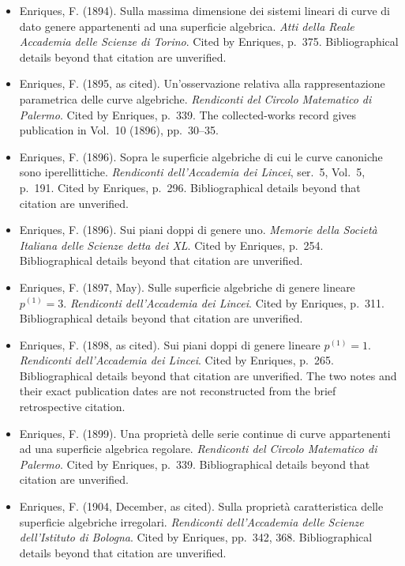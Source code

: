 \begin{sloppypar}
\begin{itemize}
\item Enriques, F. (1894). Sulla massima dimensione dei sistemi lineari di curve di dato genere appartenenti ad una superficie algebrica. \emph{Atti della Reale Accademia delle Scienze di Torino}. Cited by Enriques, p.~375. Bibliographical details beyond that citation are unverified.

\item Enriques, F. (1895, as cited). Un'osservazione relativa alla rappresentazione parametrica delle curve algebriche. \emph{Rendiconti del Circolo Matematico di Palermo}. Cited by Enriques, p.~339. The collected-works record gives publication in Vol.~10 (1896), pp.~30--35.

\item Enriques, F. (1896). Sopra le superficie algebriche di cui le curve canoniche sono iperellittiche. \emph{Rendiconti dell'Accademia dei Lincei}, ser.~5, Vol.~5, p.~191. Cited by Enriques, p.~296. Bibliographical details beyond that citation are unverified.

\item Enriques, F. (1896). Sui piani doppi di genere uno. \emph{Memorie della Società Italiana delle Scienze detta dei XL}. Cited by Enriques, p.~254. Bibliographical details beyond that citation are unverified.

\item Enriques, F. (1897, May). Sulle superficie algebriche di genere lineare $p^{(1)}=3$. \emph{Rendiconti dell'Accademia dei Lincei}. Cited by Enriques, p.~311. Bibliographical details beyond that citation are unverified.

\item Enriques, F. (1898, as cited). Sui piani doppi di genere lineare $p^{(1)}=1$. \emph{Rendiconti dell'Accademia dei Lincei}. Cited by Enriques, p.~265. Bibliographical details beyond that citation are unverified. The two notes and their exact publication dates are not reconstructed from the brief retrospective citation.

\item Enriques, F. (1899). Una proprietà delle serie continue di curve appartenenti ad una superficie algebrica regolare. \emph{Rendiconti del Circolo Matematico di Palermo}. Cited by Enriques, p.~339. Bibliographical details beyond that citation are unverified.

\item Enriques, F. (1904, December, as cited). Sulla proprietà caratteristica delle superficie algebriche irregolari. \emph{Rendiconti dell'Accademia delle Scienze dell'Istituto di Bologna}. Cited by Enriques, pp.~342, 368. Bibliographical details beyond that citation are unverified.


\end{itemize}
\end{sloppypar}
